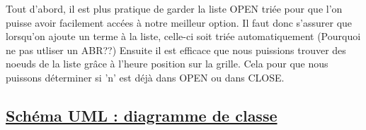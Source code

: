 \documentclass{article}
\begin{document}
Tout d'abord, il est plus pratique de garder la liste OPEN triée pour que l'on puisse avoir facilement accées à notre meilleur option. Il faut donc s'assurer que lorsqu'on ajoute un terme à la liste, celle-ci soit triée automatiquement (Pourquoi ne pas utliser un ABR??) \newline
Ensuite il est efficace que nous puissions trouver des noeuds de la liste grâce à l'heure position sur la grille. Cela pour que nous puissons déterminer si 'n' est déjà dans OPEN ou dans CLOSE.


	\newpage	
		
		
		
		
		
		
		
		
		
		
		
		
		
		
		
\begin{center}
	\section{\underline{Schéma UML : diagramme de classe}}
\end{center}

\newpage
\end{document}

